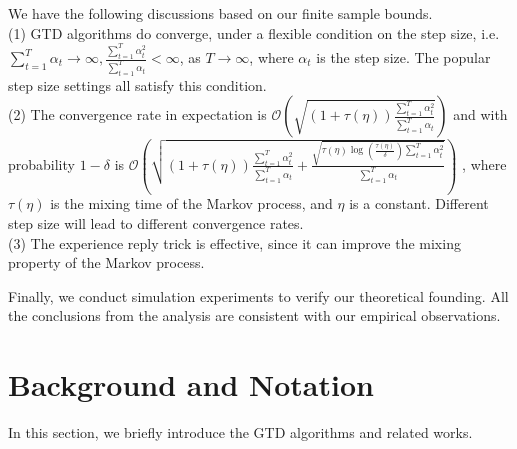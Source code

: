 \documentclass[twoside,11pt]{article}
\numberwithin{equation}{section}
\begin{document}
	We have the following discussions based on our finite sample bounds. \\
	(1) GTD algorithms do converge, under a flexible condition on the step size, i.e.  $\sum_{t=1}^{T}\alpha_t \to \infty, \frac{\sum_{t=1}^{T}\alpha_t^2}{\sum_{t=1}^{T}\alpha_t} <\infty $, as $T\to \infty$, where $\alpha_t$ is the step size. The popular step size  settings all satisfy this condition. \\
	(2) The convergence rate in expectation is     $ \mathcal{O}\left(\sqrt{(1+\tau(\eta))\frac{\sum_{t=1}^{T}\alpha_t^2}{\sum_{t=1}^{T}\alpha_t }}  \right) $  and with   probability $ 1-\delta $ is    $ \mathcal{O}\left(\sqrt{(1+\tau(\eta))\frac{\sum_{t=1}^{T}\alpha_t^2}{\sum_{t=1}^{T}\alpha_t } + \frac{\sqrt{\tau(\eta)\log(\frac{\tau(\eta)}{\delta}) \sum_{t=1}^{T}\alpha_t^2}} {\sum_{t=1}^{T}\alpha_t}}  \right)  $ , where $\tau(\eta)$   is the mixing time of the Markov process, and $\eta$ is a constant. Different step size  will lead to different convergence rates.\\
	(3) The experience reply trick is effective, since it can improve the mixing property of the Markov process.  
	
	Finally, we conduct simulation experiments to verify our theoretical founding. All the conclusions from the analysis are consistent with our empirical observations. 
	
 

\section{Background and Notation}


	In this section, we briefly introduce the GTD algorithms and related works.
\end{document}

